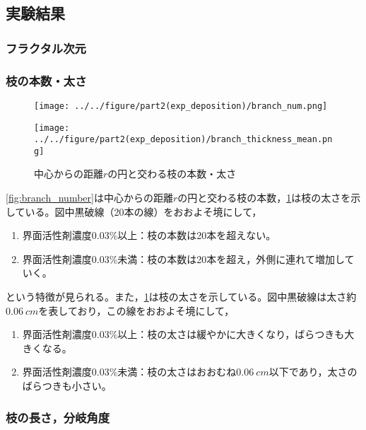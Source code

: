 \documentclass[autodetect-engine,dvi=dvipdfmx,a4paper,ja=standard,oneside,openany,11pt,draft]{bxjsarticle}
\begin{document}
\subsection{実験結果}
\subsubsection{フラクタル次元}

\subsubsection{枝の本数・太さ}
\begin{figure}[H]
  \begin{minipage}
    {0.5\textwidth}
    \centering
    \texttt{[image: ../../figure/part2(exp\_deposition)/branch\_num.png]}
    \label{fig:branch_number}
  \end{minipage}
  \begin{minipage}
    {0.5\textwidth}
    \centering
    \texttt{[image: ../../figure/part2(exp\_deposition)/branch\_thickness\_mean.png]}
    \label{fig:branch_thickness}
  \end{minipage}
  \caption{中心からの距離$r$の円と交わる枝の本数・太さ}
\end{figure}
\ref{fig:branch_number}は中心からの距離$r$の円と交わる枝の本数，\ref{fig:branch_thickness}は枝の太さを示している。図中黒破線（20本の線）をおおよそ境にして，
\begin{enumerate}
  \item 界面活性剤濃度0.03\%以上：枝の本数は20本を超えない。
  \item 界面活性剤濃度0.03\%未満：枝の本数は20本を超え，外側に連れて増加していく。
\end{enumerate}
という特徴が見られる。また，\ref{fig:branch_thickness}は枝の太さを示している。図中黒破線は太さ約$\SI{0.06}{cm}$を表しており，この線をおおよそ境にして，
\begin{enumerate}
  \item 界面活性剤濃度0.03\%以上：枝の太さは緩やかに大きくなり，ばらつきも大きくなる。
  \item 界面活性剤濃度0.03\%未満：枝の太さはおおむね$\SI{0.06}{cm}$以下であり，太さのばらつきも小さい。
\end{enumerate}
\subsubsection{枝の長さ，分岐角度}

\ifdraft{
  
  
}{}
\end{document}
